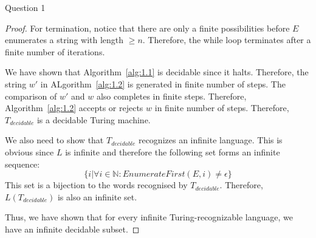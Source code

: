 \begin{solution}{Question 1}
\begin{proof}
      For termination, notice that there are only a finite possibilities before $E$ enumerates a string with length $\geq n$. Therefore, the while loop terminates after a finite number of iterations.\par
      We have shown that Algorithm~\ref{alg:1.1} is decidable since it halts. Therefore, the string $w'$ in ALgorithm~\ref{alg:1.2} is generated in finite number of steps. The comparison of $w'$ and $w$ also completes in finite steps. Therefore, Algorithm~\ref{alg:1.2} accepts or rejects $w$ in finite number of steps. Therefore, $T_{decidable}$ is a decidable Turing machine.\par
      We also need to show that $T_{decidable}$ recognizes an infinite language. This is obvious since $L$ is infinite and therefore the following set forms an infinite sequence:
      \begin{equation}
        \{i | \forall i \in \mathbb{N}: EnumerateFirst(E, i) \neq \epsilon\}
      \end{equation}
      This set is a bijection to the words recognised by $T_{decidable}$. Therefore, $L(T_{decidable})$ is also an infinite set.\par
      Thus, we have shown that for every infinite Turing-recognizable language, we have an infinite decidable subset.
    \end{proof}
\end{solution}
